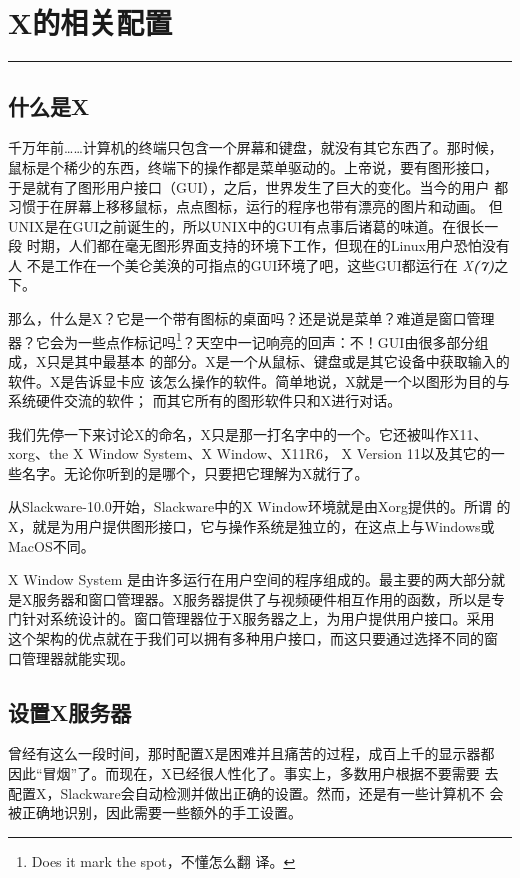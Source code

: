 
\chapter{X的相关配置}
\label{chap:xconfiguration}

\rule[0pt]{\textwidth}{0.1pt}

\section{什么是X}
\label{chap:xconfiguration:whatis}
千万年前……计算机的终端只包含一个屏幕和键盘，就没有其它东西了。那时候，
鼠标是个稀少的东西，终端下的操作都是菜单驱动的。上帝说，要有图形接口，
于是就有了图形用户接口（GUI），之后，世界发生了巨大的变化。当今的用户
都习惯于在屏幕上移移鼠标，点点图标，运行的程序也带有漂亮的图片和动画。
但UNIX是在GUI之前诞生的，所以UNIX中的GUI有点事后诸葛的味道。在很长一段
时期，人们都在毫无图形界面支持的环境下工作，但现在的Linux用户恐怕没有人
不是工作在一个美仑美涣的可指点的GUI环境了吧，这些GUI都运行在
\textit{X\textbf{(7)}}之下。

那么，什么是X？它是一个带有图标的桌面吗？还是说是菜单？难道是窗口管理
器？它会为一些点作标记吗\footnote{Does it mark the spot，不懂怎么翻
  译。}？天空中一记响亮的回声：不！GUI由很多部分组成，X只是其中最基本
的部分。X是一个从鼠标、键盘或是其它设备中获取输入的软件。X是告诉显卡应
该怎么操作的软件。简单地说，X就是一个以图形为目的与系统硬件交流的软件；
而其它所有的图形软件只和X进行对话。

我们先停一下来讨论X的命名，X只是那一打名字中的一个。它还被叫作X11、
xorg、the X Window System、X Window、X11R6， X Version 11以及其它的一
些名字。无论你听到的是哪个，只要把它理解为X就行了。

从Slackware-10.0开始，Slackware中的X Window环境就是由Xorg提供的。所谓
的X，就是为用户提供图形接口，它与操作系统是独立的，在这点上与Windows或
MacOS不同。

X Window System 是由许多运行在用户空间的程序组成的。最主要的两大部分就
是X服务器和窗口管理器。X服务器提供了与视频硬件相互作用的函数，所以是专
门针对系统设计的。窗口管理器位于X服务器之上，为用户提供用户接口。采用
这个架构的优点就在于我们可以拥有多种用户接口，而这只要通过选择不同的窗
口管理器就能实现。

\section{设置X服务器}
\label{chap:xconfiguration:configuration}
曾经有这么一段时间，那时配置X是困难并且痛苦的过程，成百上千的显示器都
因此``冒烟''了。而现在，X已经很人性化了。事实上，多数用户根据不要需要
去配置X，Slackware会自动检测并做出正确的设置。然而，还是有一些计算机不
会被正确地识别，因此需要一些额外的手工设置。

